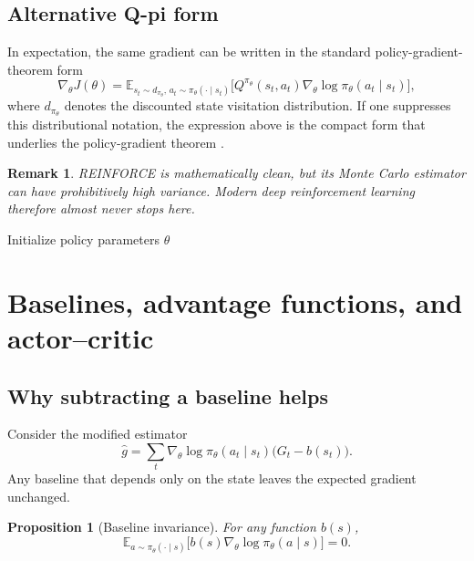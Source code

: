 \documentclass[11pt]{article}
\newtheorem{proposition}{Proposition}
\newtheorem{remark}{Remark}
\newcommand{\E}{\mathbb{E}}
\newcommand{\1}{\mathbf{1}}
\begin{document}
\subsection{Alternative Q-pi form}

In expectation, the same gradient can be written in the standard policy-gradient-theorem form
\begin{equation}
\nabla_\theta J(\theta)=\E_{s_t\sim d_{\pi_\theta},\,a_t\sim \pi_\theta(\cdot\mid s_t)}\bigl[Q^{\pi_\theta}(s_t,a_t)\nabla_\theta\log\pi_\theta(a_t\mid s_t)\bigr],
\end{equation}
where $d_{\pi_\theta}$ denotes the discounted state visitation distribution. If one suppresses this distributional notation, the expression above is the compact form that underlies the policy-gradient theorem \cite{SuttonMcAllester2000}.

\begin{remark}
REINFORCE is mathematically clean, but its Monte Carlo estimator can have prohibitively high variance. Modern deep reinforcement learning therefore almost never stops here.
\end{remark}

\begin{algorithm}[htbp]
\caption{REINFORCE}
Initialize policy parameters $\theta$\;
\end{algorithm}

\section{Baselines, advantage functions, and actor--critic}

\subsection{Why subtracting a baseline helps}

Consider the modified estimator
\begin{equation}
\hat g = \sum_t \nabla_\theta\log\pi_\theta(a_t\mid s_t)\bigl(G_t-b(s_t)\bigr).
\end{equation}
Any baseline that depends only on the state leaves the expected gradient unchanged.

\begin{proposition}[Baseline invariance]
For any function $b(s)$,
\begin{equation}
\E_{a\sim \pi_\theta(\cdot\mid s)}\bigl[b(s)\nabla_\theta\log\pi_\theta(a\mid s)\bigr]=0.
\end{equation}
\end{proposition}
\end{document}
